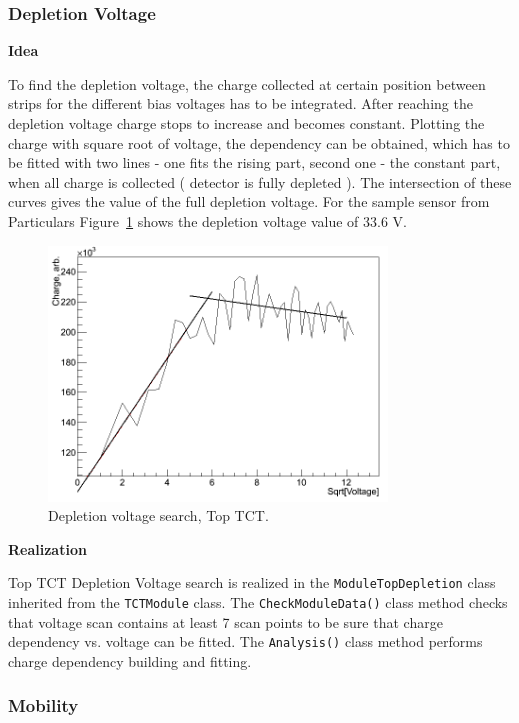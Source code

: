 \documentclass[12pt,oneside,notitlepage,abstracton,a4paper]{scrartcl}
\begin{document}
\subsubsection{Depletion Voltage}\label{modules:top:depl}

\textbf{Idea}

\indent To find the depletion voltage, the charge collected at certain position between strips for the different bias voltages has to be integrated. After reaching the depletion voltage charge stops to increase and becomes constant. Plotting the charge with square root of voltage, the dependency can be obtained, which has to be fitted with two lines - one fits the rising part, second one - the constant part, when all charge is collected ( detector is fully depleted ). The intersection of these curves gives the value of the full depletion voltage. For the sample sensor from Particulars Figure~\ref{fig:top_depl} shows the depletion voltage value of 33.6 V.

\begin{figure}[H]
    \centering
    \includegraphics[width=9cm]{pics/top_depl}
    \caption{Depletion voltage search, Top TCT.}
    \label{fig:top_depl}
\end{figure}

\textbf{Realization}

\indent Top TCT Depletion Voltage search is realized in the \lstinline$ModuleTopDepletion$ class inherited from the \lstinline$TCTModule$ class. The \lstinline$CheckModuleData()$ class method checks that voltage scan contains at least 7 scan points to be sure that charge dependency vs. voltage can be fitted. The \lstinline$Analysis()$ class method performs charge dependency building and fitting.

\subsubsection{Mobility}\label{modules:top:mobility}
\end{document}
